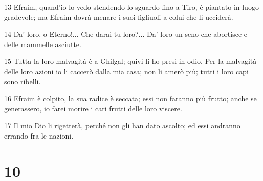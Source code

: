 \par 13 Efraim, quand'io lo vedo stendendo lo sguardo fino a Tiro, è piantato in luogo gradevole; ma Efraim dovrà menare i suoi figliuoli a colui che li ucciderà.
\par 14 Da' loro, o Eterno!... Che darai tu loro?... Da' loro un seno che abortisce e delle mammelle asciutte.
\par 15 Tutta la loro malvagità è a Ghilgal; quivi li ho presi in odio. Per la malvagità delle loro azioni io li caccerò dalla mia casa; non li amerò più; tutti i loro capi sono ribelli.
\par 16 Efraim è colpito, la sua radice è seccata; essi non faranno più frutto; anche se generassero, io farei morire i cari frutti delle loro viscere.
\par 17 Il mio Dio li rigetterà, perché non gli han dato ascolto; ed essi andranno errando fra le nazioni.

\chapter{10}


